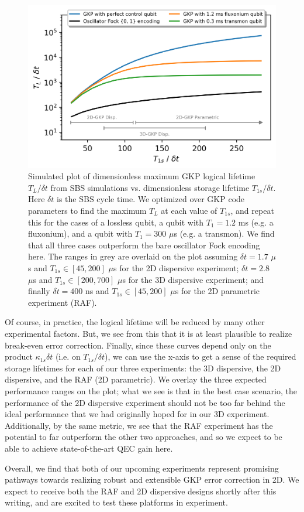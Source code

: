 \begin{figure}[t]
    \centering
    \includegraphics[width=0.8\linewidth]{Figures/5/2D_vs_3D_SBS_Comparison.png}
    \caption{Simulated plot of dimensionless maximum GKP logical lifetime $T_L/\delta t$ from SBS simulations vs. dimensionless storage lifetime $T_{1s}/\delta t$. Here $\delta t$ is the SBS cycle time. We optimized over GKP code parameters to find the maximum $T_L$ at each value of $T_{1s}$, and repeat this for the cases of a lossless qubit, a qubit with $T_1 = 1.2$ ms (e.g. a fluxonium), and a qubit with $T_1 = 300$ $\mu$s (e.g. a transmon). We find that all three cases outperform the bare oscillator Fock encoding here. The ranges in grey are overlaid on the plot assuming $\delta t = 1.7$ $\mu$s and $T_{1s} \in [45, 200]$ $\mu$s for the 2D dispersive experiment; $\delta t = 2.8$ $\mu$s and $T_{1s} \in [200, 700]$ $\mu$s for the 3D dispersive experiment; and finally $\delta t = 400$ ns and $T_{1s} \in [45, 200]$ $\mu$s for the 2D parametric experiment (RAF).}
    \label{fig:2D_vs_3D_SBS_Comparison}
\end{figure}

\noindent Of course, in practice, the logical lifetime will be reduced by many other experimental factors. But, we see from this that it is at least plausible to realize break-even error correction. Finally, since these curves depend only on the product $\kappa_{1s}\delta t$ (i.e. on $T_{1s}/\delta t$), we can use the x-axis to get a sense of the required storage lifetimes for each of our three experiments: the 3D dispersive, the 2D dispersive, and the RAF (2D parametric). We overlay the three expected performance ranges on the plot; what we see is that in the best case scenario, the performance of the 2D dispersive experiment should not be too far behind the ideal performance that we had originally hoped for in our 3D experiment. Additionally, by the same metric, we see that the RAF experiment has the potential to far outperform the other two approaches, and so we expect to be able to achieve state-of-the-art QEC gain here.

Overall, we find that both of our upcoming experiments represent promising pathways towards realizing robust and extensible GKP error correction in 2D. We expect to receive both the RAF and 2D dispersive designs shortly after this writing, and are excited to test these platforms in experiment.  

\printbibliography[heading=subbibliography, title = References]